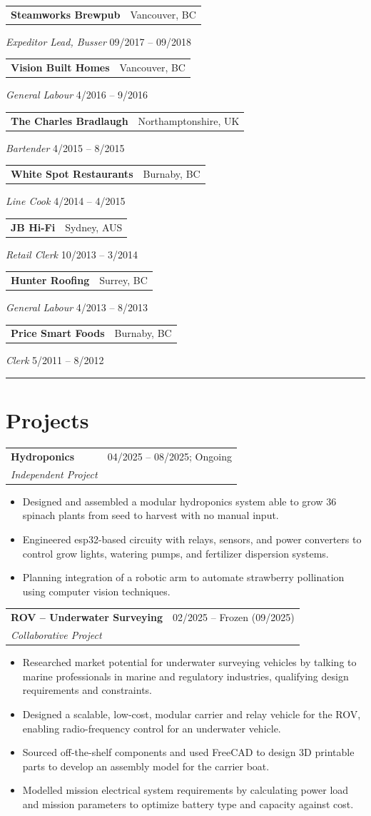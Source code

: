 \documentclass[a4paper,10pt]{article}
\makeatletter
\newcommand{\project}[4]{
	{
		\vspace{1.5mm}
		\noindent
		\begin{tabular*}{\textwidth}{@{\extracolsep{\fill}} l r}
			\textbf{#1} & #2 \\
			\textit{#3}
		\end{tabular*}
		\begin{itemize}
			\setlength{\itemsep}{-1mm}   %
			\setlength{\topsep}{0mm}
			\setlength{\parsep}{0mm}
			#4
		\end{itemize}
	}
}
\newcommand{\workbrief}[4]{
	{
		\vspace{1.5mm}
		\noindent
		\begin{tabular*}{\textwidth}{@{\extracolsep{\fill}} l r}
			\textbf{#1} & #2 \\
		\end{tabular*}
		\vspace{-5mm}
		\textit{#3} \hfill #4 \\
		\vspace{1.8mm}
	}
}
\makeatother
\begin{document}
	
	\workbrief
	{Steamworks Brewpub}
	{Vancouver, BC}
	{Expeditor Lead, Busser}
	{09/2017 – 09/2018}

	
	\workbrief
	{Vision Built Homes}
	{Vancouver, BC}
	{General Labour}
	{4/2016 – 9/2016}

	
	\workbrief
	{The Charles Bradlaugh}
	{Northamptonshire, UK}
	{Bartender}
	{4/2015 – 8/2015}
	
	\workbrief
	{White Spot Restaurants}
	{Burnaby, BC}
	{Line Cook}
	{4/2014 – 4/2015}

	\workbrief
	{JB Hi-Fi}
	{Sydney, AUS}
	{Retail Clerk}
	{10/2013 – 3/2014}

	\workbrief
	{Hunter Roofing}
	{Surrey, BC}
	{General Labour}
	{4/2013 – 8/2013}

	\workbrief
	{Price Smart Foods}
	{Burnaby, BC}
	{Clerk}
	{5/2011 – 8/2012}
	

\noindent\rule{\textwidth}{0.4pt}
\section*{Projects}
	
	\project
	{Hydroponics}
	{04/2025 – 08/2025; Ongoing}
	{Independent Project}
	{
		\item Designed and assembled a modular hydroponics system able to grow 36 spinach plants from seed to harvest with no manual input. 
		\item Engineered esp32-based circuity with relays, sensors, and power converters to control grow lights, watering pumps, and fertilizer dispersion systems. 
		\item Planning integration of a robotic arm to automate strawberry pollination using computer vision techniques.
	}
	
	\project
	{ROV – Underwater Surveying}
	{02/2025 – Frozen (09/2025)}
	{Collaborative Project}
	{
		\item Researched market potential for underwater surveying vehicles by talking to marine professionals in marine and regulatory industries, qualifying design requirements and constraints.
		\item Designed a scalable, low-cost, modular carrier and relay vehicle for the ROV, enabling radio-frequency control for an underwater vehicle.
		\item Sourced off-the-shelf components and used FreeCAD to design 3D printable parts to develop an assembly model for the carrier boat. 
		\item Modelled mission electrical system requirements by calculating power load and mission parameters to optimize battery type and capacity against cost.
	}
	
\end{document}
